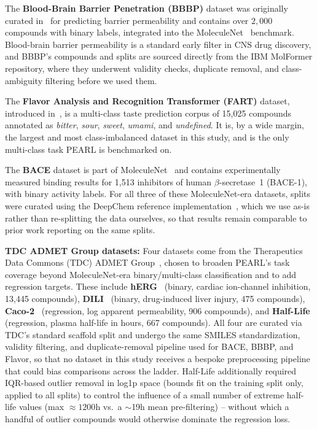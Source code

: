 \documentclass[pdflatex,sn-mathphys-num]{sn-jnl}%
\begin{document}
The \textbf{Blood-Brain Barrier Penetration (BBBP)} dataset was originally curated in~\cite{martins2012bayesian} for predicting barrier permeability and contains over $2,000$ compounds with binary labels, integrated into the MoleculeNet~\cite{wu2018moleculenet} benchmark. Blood-brain barrier permeability is a standard early filter in CNS drug discovery, and BBBP's compounds and splits are sourced directly from the IBM MolFormer repository, where they underwent validity checks, duplicate removal, and class-ambiguity filtering before we used them.

The \textbf{Flavor Analysis and Recognition Transformer (FART)} dataset, introduced in~\cite{zimmermann2024fart}, is a multi-class taste prediction corpus of 15,025 compounds annotated as \textit{bitter}, \textit{sour}, \textit{sweet}, \textit{umami}, and \textit{undefined}. It is, by a wide margin, the largest and most class-imbalanced dataset in this study, and is the only multi-class task PEARL is benchmarked on.

The \textbf{BACE} dataset is part of MoleculeNet~\cite{wu2018moleculenet} and contains experimentally measured binding results for 1,513 inhibitors of human $\beta$-secretase~1 (BACE-1), with binary activity labels. For all three of these MoleculeNet-era datasets, splits were curated using the DeepChem reference implementation~\cite{ramsundar2019deep}, which we use as-is rather than re-splitting the data ourselves, so that results remain comparable to prior work reporting on the same splits.

\textbf{TDC ADMET Group datasets:} Four datasets come from the Therapeutics Data Commons (TDC) ADMET Group~\cite{huang2021tdc}, chosen to broaden PEARL's task coverage beyond MoleculeNet-era binary/multi-class classification and to add regression targets. These include \textbf{hERG}~\cite{wang2016herg} (binary, cardiac ion-channel inhibition, 13{,}445 compounds), \textbf{DILI}~\cite{xu2019dili} (binary, drug-induced liver injury, 475 compounds), \textbf{Caco-2}~\cite{wang2016caco2} (regression, log apparent permeability, 906 compounds), and \textbf{Half-Life}~\cite{obach2008half} (regression, plasma half-life in hours, 667 compounds). All four are curated via TDC's standard scaffold split and undergo the same SMILES standardization, validity filtering, and duplicate-removal pipeline used for BACE, BBBP, and Flavor, so that no dataset in this study receives a bespoke preprocessing pipeline that could bias comparisons across the ladder. Half-Life additionally required IQR-based outlier removal in log1p space (bounds fit on the training split only, applied to all splits) to control the influence of a small number of extreme half-life values (max $\approx 1200$h vs.\ a $\sim$19h mean pre-filtering) -- without which a handful of outlier compounds would otherwise dominate the regression loss.
\end{document}
